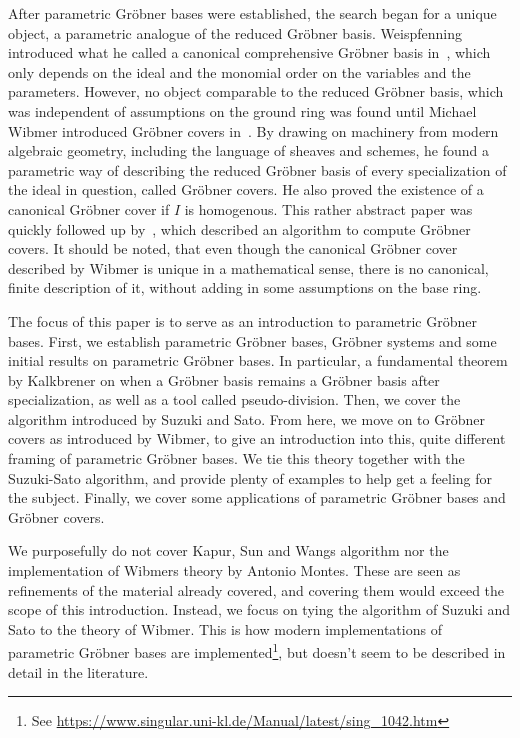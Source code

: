 After parametric Gröbner bases were established, the search began for a unique object, a parametric analogue of the reduced Gröbner basis. Weispfenning introduced what he called a canonical comprehensive Gröbner basis in~\cite{WEISPFENNING2003669}, which only depends on the ideal and the monomial order on the variables and the parameters. However, no object comparable to the reduced Gröbner basis, which was independent of assumptions on the ground ring was found until Michael Wibmer introduced Gröbner covers in~\cite{grb_covers}. By drawing on machinery from modern algebraic geometry, including the language of sheaves and schemes, he found a parametric way of describing the reduced Gröbner basis of every specialization of the ideal in question, called Gröbner covers. He also proved the existence of a canonical Gröbner cover if $I$ is homogenous. This rather abstract paper was quickly followed up by~\cite{MONTES20101391}, which described an algorithm to compute Gröbner covers. It should be noted, that even though the canonical Gröbner cover described by Wibmer is unique in a mathematical sense, there is no canonical, finite description of it, without adding in some assumptions on the base ring.

The focus of this paper is to serve as an introduction to parametric Gröbner bases. First, we establish parametric Gröbner bases, Gröbner systems and some initial results on parametric Gröbner bases. In particular, a fundamental theorem by Kalkbrener\cite{Kalkbrener} on when a Gröbner basis remains a Gröbner basis after specialization, as well as a tool called pseudo-division. Then, we cover the algorithm introduced by Suzuki and Sato. From here, we move on to Gröbner covers as introduced by Wibmer, to give an introduction into this, quite different framing of parametric Gröbner bases. We tie this theory together with the Suzuki-Sato algorithm, and provide plenty of examples to help get a feeling for the subject. Finally, we cover some applications of parametric Gröbner bases and Gröbner covers.

We purposefully do not cover Kapur, Sun and Wangs algorithm nor the implementation of Wibmers theory by Antonio Montes\cite{MONTES20101391}. These are seen as refinements of the material already covered, and covering them would exceed the scope of this introduction. Instead, we focus on tying the algorithm of Suzuki and Sato to the theory of Wibmer. This is how modern implementations of parametric Gröbner bases are implemented\footnote{See \url{https://www.singular.uni-kl.de/Manual/latest/sing_1042.htm}}, but doesn't seem to be described in detail in the literature.

